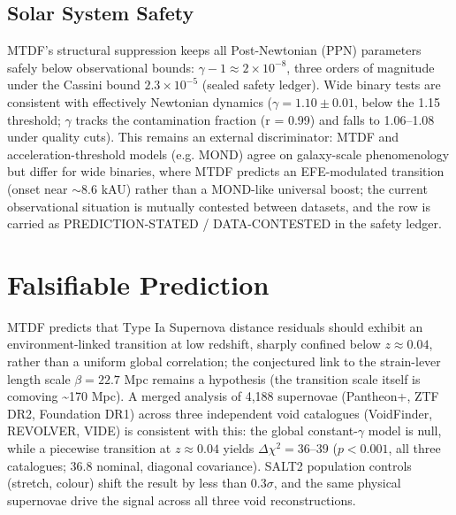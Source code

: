 \documentclass[11pt,a4paper]{article}
\begin{document}
\subsection{Solar System Safety}
MTDF's structural suppression keeps all Post-Newtonian (PPN) parameters safely below observational bounds: $\gamma - 1 \approx 2\times10^{-8}$, three orders of magnitude under the Cassini bound $2.3\times10^{-5}$ (sealed safety ledger). Wide binary tests are consistent with effectively Newtonian dynamics ($\gamma = 1.10 \pm 0.01$, below the 1.15 threshold; $\gamma$ tracks the contamination fraction (r = 0.99) and falls to 1.06--1.08 under quality cuts). This remains an external discriminator: MTDF and acceleration-threshold models (e.g. MOND) agree on galaxy-scale phenomenology but differ for wide binaries, where MTDF predicts an EFE-modulated transition (onset near $\sim 8.6$ kAU) rather than a MOND-like universal boost; the current observational situation is mutually contested between datasets, and the row is carried as PREDICTION-STATED / DATA-CONTESTED in the safety ledger.

\section{Falsifiable Prediction}
MTDF predicts that Type Ia Supernova distance residuals should exhibit an environment-linked transition at low redshift, sharply confined below $z \approx 0.04$, rather than a uniform global correlation; the conjectured link to the strain-lever length scale $\beta = 22.7$ Mpc remains a hypothesis (the transition scale itself is comoving \~{}170 Mpc). A merged analysis of 4,188 supernovae (Pantheon+, ZTF DR2, Foundation DR1) across three independent void catalogues (VoidFinder, REVOLVER, VIDE) is consistent with this: the global constant-$\gamma$ model is null, while a piecewise transition at $z \approx 0.04$ yields $\Delta\chi^2 = 36$--$39$ ($p < 0.001$, all three catalogues; 36.8 nominal, diagonal covariance). SALT2 population controls (stretch, colour) shift the result by less than 0.3$\sigma$, and the same physical supernovae drive the signal across all three void reconstructions.
\end{document}
